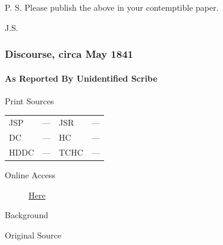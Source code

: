 				P. S. Please publish the above in your contemptible paper.
				
				J.S.
				
		\subsubsection{Discourse, circa May 1841}
			\label{EMS-1841-JS-CIR-MAY-1841}
			
			\paragraph{As Reported By Unidentified Scribe}
				\label{EMS-1841-JS-CIR-MAY-1841-US}
				
				\begin{description}
					\item[Print Sources]
				\end{description}

				\begin{tabular}{p{0.5in}p{1in}p{0.5in}p{1in}}
					JSP	 	& ---		& JSR 		& --- \\
					DC	 	& ---		& HC 		& --- \\
					HDDC 	& ---		& TCHC 		& --- \\
				\end{tabular}
				
				\begin{description}
					\item[Online Access] \href{https://www.josephsmithpapers.org/paper-summary/discourse-circa-may-1841-as-reported-by-unidentified-scribe/1}{Here}
				\end{description}
				
				\begin{description}
					\item[Background]
				\end{description}
				
				
				\begin{description}
					\item[Original Source]
				\end{description}
				

